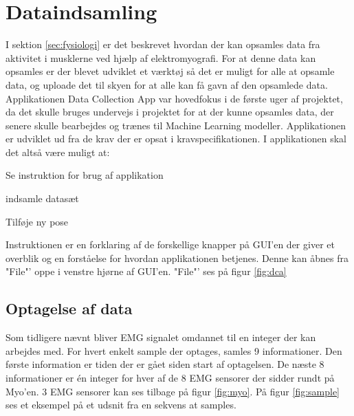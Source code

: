 \thispagestyle{fancy}
\chapter{Dataindsamling}
\label{chp:dataingsamlingChapter}
I sektion \ref{sec:fysiologi} er det beskrevet hvordan der kan opsamles data fra aktivitet i musklerne ved hjælp af elektromyografi. For at denne data kan opsamles er der blevet udviklet et værktøj så det er muligt for alle at opsamle data, og uploade det til skyen for at alle kan få gavn af den opsamlede data. Applikationen Data Collection App var hovedfokus i de første uger af projektet, da det skulle bruges undervejs i projektet for at der kunne opsamles data, der senere skulle bearbejdes og trænes til Machine Learning modeller. Applikationen er udviklet ud fra de krav der er opsat i kravspecifikationen\citep{RefWorks:8}. I applikationen skal det altså være muligt at:
\begin{myItemize}
	\item Se instruktion for brug af applikation
	\item indsamle datasæt
	\item Tilføje ny pose
\end{myItemize}
Instruktionen er en forklaring af de forskellige knapper på GUI'en der giver et overblik og en forståelse for hvordan applikationen betjenes. Denne kan åbnes fra "File"' oppe i venstre hjørne af GUI'en. "File"' ses på figur \ref{fig:dca} 

\section{Optagelse af data}
\label{sec:optagelsedata}
Som tidligere nævnt bliver EMG signalet omdannet til en integer der kan arbejdes med. For hvert enkelt sample der optages, samles 9 informationer. Den første information er tiden der er gået siden start af optagelsen. De næste 8 informationer er én integer for hver af de 8 EMG sensorer der sidder rundt på Myo'en. 3 EMG sensorer kan ses tilbage på figur \ref{fig:myo}.
På figur \ref{fig:sample} ses et eksempel på et udsnit fra en sekvens at samples.


